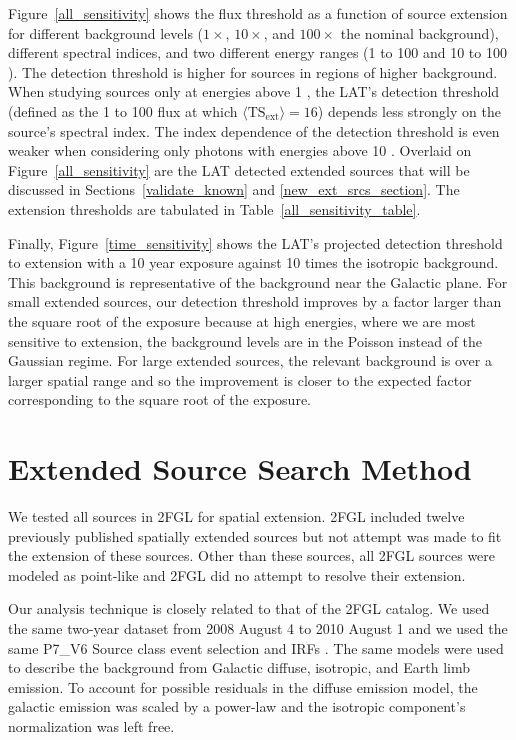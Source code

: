 \documentclass[12pt,preprint]{aastex}
\newcommand{\gev}{\text{GeV}\xspace}
\newcommand{\tsext}{{\ensuremath{\text{TS}_{\text{ext}}}}\xspace}
\begin{document}
Figure~\ref{all_sensitivity} shows the flux threshold as a function of
source extension for different background levels ($1\times$, $10\times$,
and $100\times$ the nominal background), different spectral indices,
and two different energy ranges (1 \gev to 100 \gev and 10 \gev to
100 \gev).  The detection threshold is higher for sources in regions of
higher background.  When studying sources only at energies above 1 \gev,
the LAT's detection threshold (defined as the 1 \gev to 100 \gev flux at
which $\langle\tsext\rangle=16$) depends less strongly on the source's
spectral index. The index dependence of the detection threshold is
even weaker when considering only photons with energies above 10 \gev.
Overlaid on Figure~\ref{all_sensitivity} are the LAT detected extended
sources that will be discussed in Sections~\ref{validate_known} and
\ref{new_ext_srcs_section}.  The extension thresholds are tabulated in
Table~\ref{all_sensitivity_table}.

Finally, Figure~\ref{time_sensitivity} shows the LAT's projected
detection threshold to extension with a 10 year
exposure against 10 times
the isotropic background. This background is representative of the
background near the Galactic plane.  For small extended sources, our
detection threshold improves by a factor larger than the square root
of the exposure because at high energies, where we are most sensitive
to extension, the background levels are in the Poisson instead of the
Gaussian regime.  For large extended sources, the relevant background
is over a larger spatial range and so the improvement is closer to the
expected factor corresponding to the square root of the exposure.


\section{Extended Source Search Method}
\label{extended_source_search_method}

We tested all sources in 2FGL for spatial extension.
2FGL included
twelve previously published spatially extended sources but not
attempt was made to fit the extension of these sources. Other than these sources,
all 2FGL sources were modeled as point-like and 2FGL did no attempt
to resolve their extension.

Our analysis technique is closely related to that 
of the 2FGL catalog. We used the same two-year dataset from 2008 August 4
to 2010 August 1 and we used the same P7\_V6 Source class
event selection and IRFs \citep{lat_on_orbit_psf}.  
The same 
models were used to describe the background from Galactic diffuse, isotropic, and
Earth limb emission.  To account for possible residuals in the diffuse
emission model, the galactic emission was scaled by a power-law
and the isotropic component's normalization was left free.
\end{document}
